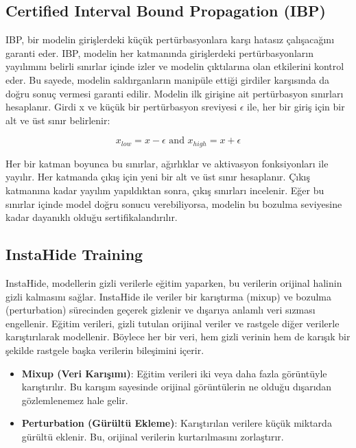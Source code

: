 \subsection{Certified Interval Bound Propagation (IBP)}

IBP, bir modelin girişlerdeki küçük pertürbasyonlara karşı hatasız çalışacağını garanti eder. IBP, modelin her katmanında girişlerdeki pertürbasyonların yayılımını belirli sınırlar içinde izler ve modelin çıktılarına olan etkilerini kontrol eder. Bu sayede, modelin saldırganların manipüle ettiği girdiler karşısında da doğru sonuç vermesi garanti edilir. Modelin ilk girişine ait pertürbasyon sınırları hesaplanır. Girdi x ve küçük bir pertürbasyon sreviyesi $\epsilon$ ile, her bir giriş için bir alt ve üst sınır belirlenir:

\[ x_{low} = x - \epsilon \text{ and } x_{high} = x + \epsilon \]

Her bir katman boyunca bu sınırlar, ağırlıklar ve aktivasyon fonksiyonları ile yayılır. Her katmanda çıkış için yeni bir alt ve üst sınır hesaplanır. Çıkış katmanına kadar yayılım yapıldıktan sonra, çıkış sınırları incelenir. Eğer bu sınırlar içinde model doğru sonucu verebiliyorsa, modelin bu bozulma seviyesine kadar dayanıklı olduğu sertifikalandırılır.

\newpage

\subsection{InstaHide Training}

InstaHide, modellerin gizli verilerle eğitim yaparken, bu verilerin orijinal halinin gizli kalmasını sağlar. InstaHide ile veriler bir karıştırma (mixup) ve bozulma (perturbation) sürecinden geçerek gizlenir ve dışarıya anlamlı veri sızması engellenir. Eğitim verileri, gizli tutulan orijinal veriler ve rastgele diğer verilerle karıştırılarak modellenir. Böylece her bir veri, hem gizli verinin hem de karışık bir şekilde rastgele başka verilerin bileşimini içerir.

\begin{itemize}
    \item \textbf{Mixup (Veri Karışımı)}: Eğitim verileri iki veya daha fazla görüntüyle karıştırılır. Bu karışım sayesinde orijinal görüntülerin ne olduğu dışarıdan gözlemlenemez hale gelir.
    \item \textbf{Perturbation (Gürültü Ekleme)}: Karıştırılan verilere küçük miktarda gürültü eklenir. Bu, orijinal verilerin kurtarılmasını zorlaştırır.
\end{itemize}


